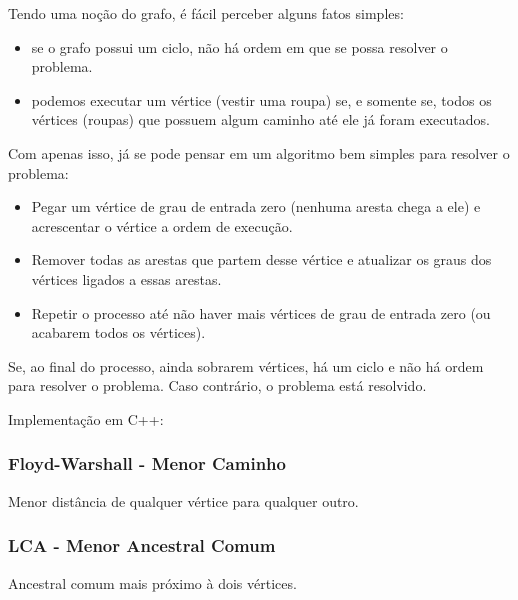 \documentclass[a4paper,12pt]{article}
\begin{document}
\noindent Tendo uma noção do grafo, é fácil perceber alguns fatos simples:

\begin{itemize}
    \item se o grafo possui um ciclo, não há ordem em que se possa resolver o problema.
    \item podemos executar um vértice (vestir uma roupa) se, e somente se, todos os vértices (roupas) que possuem algum caminho até ele já foram executados.
\end{itemize}

\noindent Com apenas isso, já se pode pensar em um algoritmo bem simples para resolver o problema:

\begin{itemize}
    \item Pegar um vértice de grau de entrada zero (nenhuma aresta chega a ele) e acrescentar o vértice a ordem de execução.
    \item Remover todas as arestas que partem desse vértice e atualizar os graus dos vértices ligados a essas arestas.
    \item Repetir o processo até não haver mais vértices de grau de entrada zero (ou acabarem todos os vértices).
\end{itemize}

\noindent Se, ao final do processo, ainda sobrarem vértices, há um ciclo e não há ordem para resolver o problema. Caso contrário, o problema está resolvido.

\noindent Implementação em C++:


\subsubsection{Floyd-Warshall - Menor Caminho}

Menor distância de qualquer vértice para qualquer outro.


\subsubsection{LCA - Menor Ancestral Comum}

Ancestral comum mais próximo à dois vértices.
\end{document}
